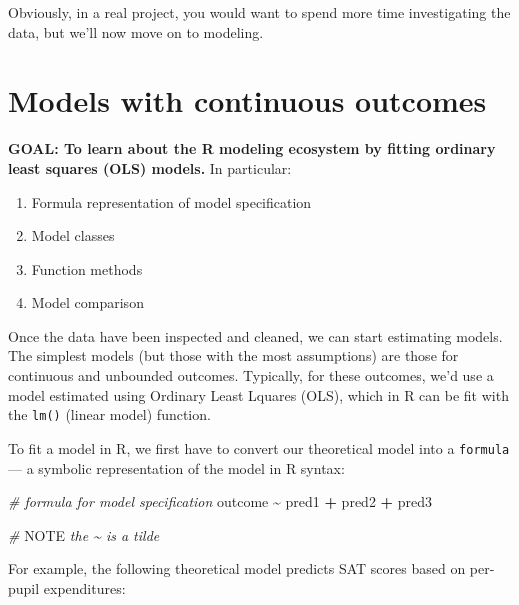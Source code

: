 \documentclass[
]{book}
\newenvironment{Shaded}{\begin{snugshade}}{\end{snugshade}}
\newcommand{\AlertTok}[1]{\textcolor[rgb]{0.94,0.16,0.16}{#1}}
\newcommand{\CommentTok}[1]{\textcolor[rgb]{0.56,0.35,0.01}{\textit{#1}}}
\newcommand{\NormalTok}[1]{#1}
\newcommand{\OperatorTok}[1]{\textcolor[rgb]{0.81,0.36,0.00}{\textbf{#1}}}
\newcommand{\StringTok}[1]{\textcolor[rgb]{0.31,0.60,0.02}{#1}}
\providecommand{\tightlist}{%
  \setlength{\itemsep}{0pt}\setlength{\parskip}{0pt}}
\begin{document}
Obviously, in a real project, you would want to spend more time investigating the data,
but we'll now move on to modeling.

\hypertarget{models-with-continuous-outcomes}{%
\section{Models with continuous outcomes}\label{models-with-continuous-outcomes}}

\begin{alert}

\textbf{GOAL: To learn about the R modeling ecosystem by fitting ordinary least squares (OLS) models.} In particular:

\begin{enumerate}
\def\labelenumi{\arabic{enumi}.}
\tightlist
\item
  Formula representation of model specification
\item
  Model classes
\item
  Function methods
\item
  Model comparison
\end{enumerate}

\end{alert}

Once the data have been inspected and cleaned, we can start estimating models. The simplest models (but those with the most assumptions) are those for continuous and unbounded outcomes. Typically, for these outcomes, we'd use a model estimated using Ordinary Least Lquares (OLS), which in R can be fit with the \texttt{lm()} (linear model) function.

To fit a model in R, we first have to convert our theoretical model into a \texttt{formula} --- a symbolic representation of the model in R syntax:

\begin{Shaded}
\begin{Highlighting}[]
\CommentTok{\# formula for model specification}
\NormalTok{outcome }\OperatorTok{\textasciitilde{}}\StringTok{ }\NormalTok{pred1 }\OperatorTok{+}\StringTok{ }\NormalTok{pred2 }\OperatorTok{+}\StringTok{ }\NormalTok{pred3}

\CommentTok{\# }\AlertTok{NOTE}\CommentTok{ the \textasciitilde{} is a tilde}
\end{Highlighting}
\end{Shaded}

For example, the following theoretical model predicts SAT scores based on per-pupil expenditures:
\end{document}

